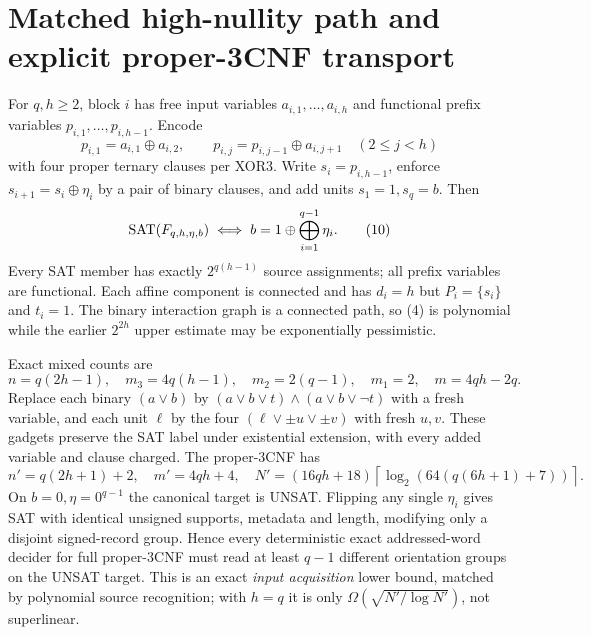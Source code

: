 \documentclass[11pt]{article}
\begin{document}
\section{Matched high-nullity path and explicit proper-3CNF transport}
For $q,h\ge2$, block $i$ has free input variables
$a_{i,1},\ldots,a_{i,h}$ and functional prefix variables
$p_{i,1},\ldots,p_{i,h-1}$. Encode
\[
p_{i,1}=a_{i,1}\oplus a_{i,2},\qquad
p_{i,j}=p_{i,j-1}\oplus a_{i,j+1}\quad(2\le j<h) \tag{9}
\]
with four proper ternary clauses per XOR3.
Write $s_i=p_{i,h-1}$, enforce $s_{i+1}=s_i\oplus\eta_i$
by a pair of binary clauses, and add units $s_1=1,s_q=b$.
Then
\[
{\rm SAT}(F_{q,h,\eta,b})\iff
b=1\oplus\bigoplus_{i=1}^{q-1}\eta_i. \tag{10}
\]
Every SAT member has exactly $2^{q(h-1)}$ source assignments;
all prefix variables are functional. Each affine component is
connected and has $d_i=h$ but $P_i=\{s_i\}$ and $t_i=1$.
The binary interaction graph is a connected path, so (4)
is polynomial while the earlier $2^{2h}$ upper estimate may be
exponentially pessimistic.

Exact mixed counts are
\[
n=q(2h-1),\quad m_3=4q(h-1),\quad m_2=2(q-1),\quad
m_1=2,\quad m=4qh-2q. \tag{11}
\]
Replace each binary $(a\vee b)$ by
$(a\vee b\vee t)\wedge(a\vee b\vee\neg t)$
with a fresh variable, and each unit $\ell$ by
the four $(\ell\vee\pm u\vee\pm v)$ with fresh $u,v$.
These gadgets preserve the SAT label under existential extension,
with every added variable and clause charged. The proper-3CNF has
\[
n'=q(2h+1)+2,\quad m'=4qh+4,\quad
N'=(16qh+18)\left\lceil
\log_2(64(q(6h+1)+7))\right\rceil. \tag{12}
\]
On $b=0,\eta=0^{q-1}$ the canonical target is UNSAT.
Flipping any single $\eta_i$ gives SAT with identical unsigned
supports, metadata and length, modifying only a disjoint
signed-record group. Hence every deterministic exact addressed-word
decider for full proper-3CNF must read at least $q-1$ different
orientation groups on the UNSAT target. This is an exact
\emph{input acquisition} lower bound, matched by polynomial source
recognition; with $h=q$ it is only
$\Omega(\sqrt{N'/\log N'})$, not superlinear.
\end{document}
